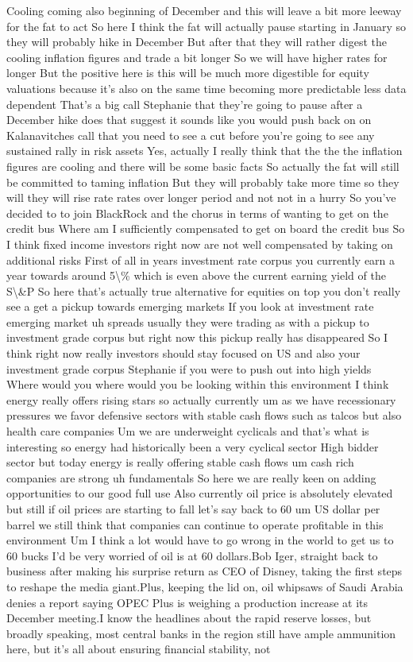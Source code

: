 \documentclass{article}%
\begin{document}
Cooling coming also beginning of December and this will leave a bit more leeway for the fat to act So here I think the fat will actually pause starting in January so they will probably hike in December But after that they will rather digest the cooling inflation figures and trade a bit longer So we will have higher rates for longer But the positive here is this will be much more digestible for equity valuations because it's also on the same time becoming more predictable less data dependent That's a big call Stephanie that they're going to pause after a December hike does that suggest it sounds like you would push back on on Kalanavitches call that you need to see a cut before you're going to see any sustained rally in risk assets Yes, actually I really think that the the the inflation figures are cooling and there will be some basic facts So actually the fat will still be committed to taming inflation But they will probably take more time so they will they will rise rate rates over longer period and not not in a hurry So you've decided to to join BlackRock and the chorus in terms of wanting to get on the credit bus Where am I sufficiently compensated to get on board the credit bus So I think fixed income investors right now are not well compensated by taking on additional risks First of all in years investment rate corpus you currently earn a year towards around 5\textbackslash{}\% which is even above the current earning yield of the S\textbackslash{}\&P So here that's actually true alternative for equities on top you don't really see a get a pickup towards emerging markets If you look at investment rate emerging market uh spreads usually they were trading as with a pickup to investment grade corpus but right now this pickup really has disappeared So I think right now really investors should stay focused on US and also your investment grade corpus Stephanie if you were to push out into high yields Where would you where would you be looking within this environment I think energy really offers rising stars so actually currently um as we have recessionary pressures we favor defensive sectors with stable cash flows such as talcos but also health care companies Um we are underweight cyclicals and that's what is interesting so energy had historically been a very cyclical sector High bidder sector but today energy is really offering stable cash flows um cash rich companies are strong uh fundamentals So here we are really keen on adding opportunities to our good full use Also currently oil price is absolutely elevated but still if oil prices are starting to fall let's say back to 60 um US dollar per barrel we still think that companies can continue to operate profitable in this environment Um I think a lot would have to go wrong in the world to get us to 60 bucks I'd be very worried of oil is at 60 dollars.Bob Iger, straight back to business after making his surprise return as CEO of Disney, taking the first steps to reshape the media giant.Plus, keeping the lid on, oil whipsaws of Saudi Arabia denies a report saying OPEC Plus is weighing a production increase at its December meeting.I know the headlines about the rapid reserve losses, but broadly speaking, most central banks in the region still have ample ammunition here, but it's all about ensuring financial stability, not 
\end{document}
